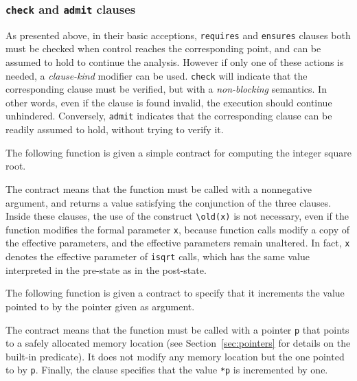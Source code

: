 \subsubsection{\texorpdfstring{\lstinline|check|}{check} and \texorpdfstring{\lstinline|admit|}{admit} clauses}\label{sec:check-admit-clauses}

As presented above, in their basic acceptions, \lstinline|requires|
and \lstinline|ensures| clauses both must be checked when control reaches the
corresponding point, and can be assumed to hold to continue the analysis. However
if only one of these actions is needed, a {\it clause-kind} modifier can be used.
\lstinline|check| will indicate that the corresponding clause must be verified,
but with a \emph{non-blocking} semantics. In other words, even if the clause is found
invalid, the execution should continue unhindered. Conversely, \lstinline|admit|
indicates that the corresponding clause can be readily assumed to hold, without
trying to verify it.

\begin{example}
  The following function is given a simple contract for computing
  the integer square root.

%
  The contract means that the function must be called with a
  nonnegative argument, and returns a value satisfying
  the conjunction of the three \ensures{} clauses.
  Inside these \ensures{} clauses, the use of the construct \lstinline|\old(x)|
  is not necessary, even if the function modifies the formal
  parameter
  \lstinline|x|, because function calls modify a copy of the effective parameters,
  and the effective parameters remain unaltered.  In fact, \lstinline|x| denotes
  the effective parameter of \lstinline|isqrt| calls, which has the same value
  interpreted in the pre-state as in the post-state.

\end{example}

\begin{example}
  The following function is given a contract to specify that it increments
  the value pointed to by the pointer given as argument.

%
  The contract means that the function must be called with a pointer
  \lstinline|p| that points to a safely allocated memory location (see
  Section~\ref{sec:pointers} for details on the \valid built-in
  predicate). It does not modify any memory location but the one
  pointed to by \lstinline|p|. Finally, the \ensures clause specifies that
  the value \lstinline!*p! is incremented by one.
\end{example}

